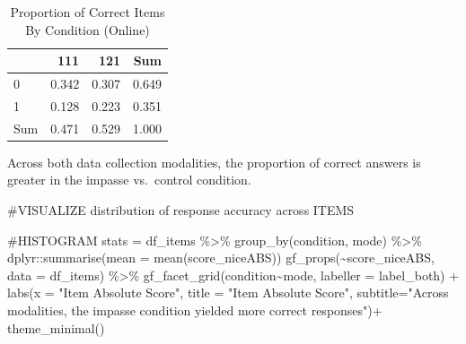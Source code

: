 \documentclass[
  letterpaper,
  DIV=11,
  numbers=noendperiod]{scrreprt}
\newenvironment{Shaded}{\begin{snugshade}}{\end{snugshade}}
\newcommand{\AttributeTok}[1]{\textcolor[rgb]{0.40,0.45,0.13}{#1}}
\newcommand{\CommentTok}[1]{\textcolor[rgb]{0.37,0.37,0.37}{#1}}
\newcommand{\FunctionTok}[1]{\textcolor[rgb]{0.28,0.35,0.67}{#1}}
\newcommand{\NormalTok}[1]{\textcolor[rgb]{0.00,0.23,0.31}{#1}}
\newcommand{\OtherTok}[1]{\textcolor[rgb]{0.00,0.23,0.31}{#1}}
\newcommand{\SpecialCharTok}[1]{\textcolor[rgb]{0.37,0.37,0.37}{#1}}
\newcommand{\StringTok}[1]{\textcolor[rgb]{0.13,0.47,0.30}{#1}}
\begin{document}
\begin{table}

\caption{Proportion of Correct Items By Condition (Online)}
\centering
\begin{tabular}[t]{l|r|r|r}
\hline
  & 111 & 121 & Sum\\
\hline
0 & 0.342 & 0.307 & 0.649\\
\hline
1 & 0.128 & 0.223 & 0.351\\
\hline
Sum & 0.471 & 0.529 & 1.000\\
\hline
\end{tabular}
\end{table}

Across both data collection modalities, the proportion of correct
answers is greater in the impasse vs.~control condition.

\begin{Shaded}
\begin{Highlighting}[]
\CommentTok{\#VISUALIZE distribution of response accuracy across ITEMS}

\CommentTok{\#HISTOGRAM}
\NormalTok{stats }\OtherTok{=}\NormalTok{ df\_items }\SpecialCharTok{\%\textgreater{}\%} \FunctionTok{group\_by}\NormalTok{(condition, mode) }\SpecialCharTok{\%\textgreater{}\%}\NormalTok{ dplyr}\SpecialCharTok{::}\FunctionTok{summarise}\NormalTok{(}\AttributeTok{mean =} \FunctionTok{mean}\NormalTok{(score\_niceABS))}
\FunctionTok{gf\_props}\NormalTok{(}\SpecialCharTok{\textasciitilde{}}\NormalTok{score\_niceABS, }\AttributeTok{data =}\NormalTok{ df\_items) }\SpecialCharTok{\%\textgreater{}\%} 
  \FunctionTok{gf\_facet\_grid}\NormalTok{(condition}\SpecialCharTok{\textasciitilde{}}\NormalTok{mode, }\AttributeTok{labeller =}\NormalTok{ label\_both) }\SpecialCharTok{+}
  \FunctionTok{labs}\NormalTok{(}\AttributeTok{x =} \StringTok{"Item Absolute Score"}\NormalTok{,}
       \AttributeTok{title =} \StringTok{"Item Absolute Score"}\NormalTok{,}
       \AttributeTok{subtitle=}\StringTok{"Across modalities, the impasse condition yielded more correct responses"}\NormalTok{)}\SpecialCharTok{+}
  \FunctionTok{theme\_minimal}\NormalTok{()}
\end{Highlighting}
\end{Shaded}
\end{document}
